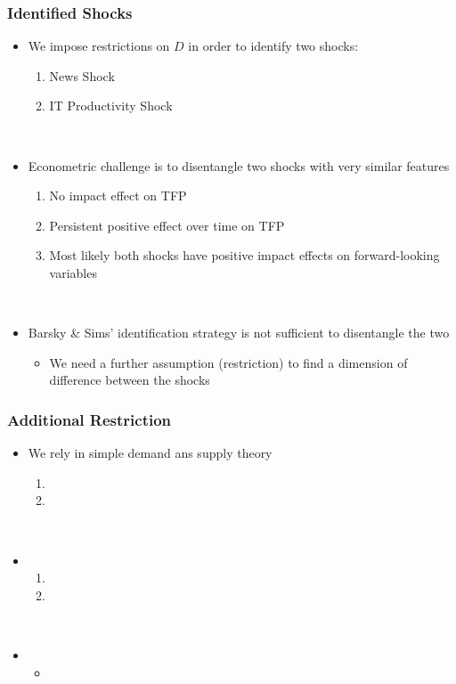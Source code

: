 \documentclass{beamer}
\begin{document}
\begin{frame}
\frametitle{Identified Shocks}


\begin{itemize}
	\item We impose restrictions on $D$ in order to identify two shocks:
	\begin{enumerate}
		\item News Shock
		\item IT Productivity Shock
	\end{enumerate}

\
	
	\item Econometric challenge is to disentangle two shocks with very similar features 
		\begin{enumerate}
		\item No impact effect on TFP
		\item Persistent positive effect over time on TFP
		\item Most likely both shocks have positive impact effects on forward-looking variables
	\end{enumerate}

\
	
	
	\item Barsky \& Sims' identification strategy is not sufficient to disentangle the two
	\begin{itemize}
		\item We need a further assumption (restriction) to find a dimension of difference between the shocks
	\end{itemize}
\end{itemize}


\end{frame}

\begin{frame}
\frametitle{Additional Restriction}


\begin{itemize}
	\item We rely in simple demand ans supply theory
	\begin{enumerate}
		\item 
		\item 
	\end{enumerate}
	
	\
	
	\item 
	\begin{enumerate}
		\item 
		\item 
	\end{enumerate}
	
	\
	
	
	\item 
	\begin{itemize}
		\item 
	\end{itemize}
\end{itemize}


\end{frame}
\end{document}
